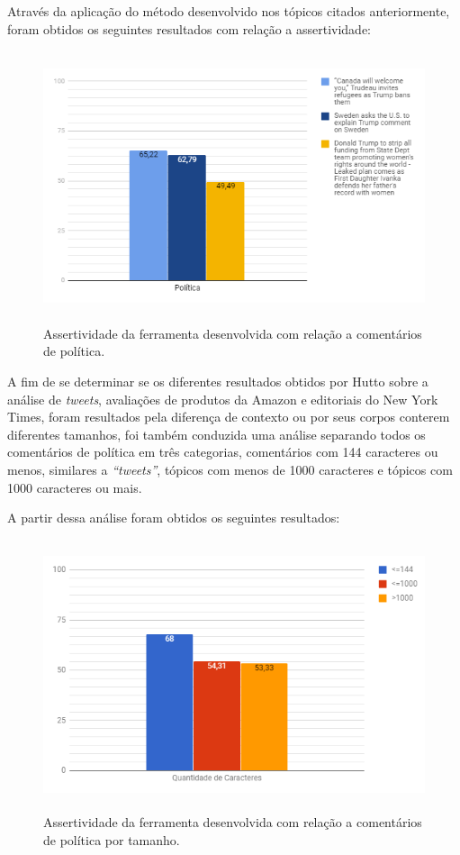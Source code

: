 Através da aplicação do método desenvolvido nos tópicos citados anteriormente,
foram obtidos os seguintes resultados com relação a assertividade:

\begin{figure}[!htbp]
\centering
\includegraphics[height=300px]{imagens/politica1.png}
\caption{Assertividade da ferramenta desenvolvida com relação a comentários de
política.}
\label{fig:pol1}
\end{figure}

A fim de se determinar se os diferentes resultados obtidos por Hutto
\cite{conf/icwsm/HuttoG14} sobre a análise de \textit{tweets}, avaliações
de produtos da Amazon e editoriais do New York Times, foram resultados pela
diferença de contexto ou por seus corpos conterem diferentes tamanhos, foi
também conduzida uma análise separando todos os comentários de política em três
categorias, comentários com 144 caracteres ou menos, similares a
\textit{``tweets''}, tópicos com menos de 1000 caracteres e tópicos com 1000
caracteres ou mais. 

\newpage 
A partir dessa análise foram obtidos os seguintes
resultados:

\begin{figure}[!htbp]
\centering
\includegraphics[height=300px]{imagens/politica2.png}
\caption{Assertividade da ferramenta desenvolvida com relação a comentários de
política por tamanho.}
\label{fig:pol2}
\end{figure}


